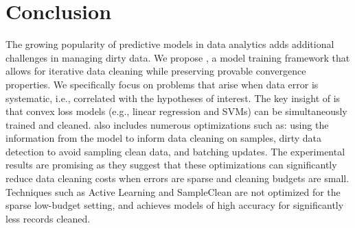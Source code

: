 \section{Conclusion}
The growing popularity of predictive models in data analytics adds additional challenges in managing dirty data.
We propose \sys, a model training framework that allows for iterative data cleaning while preserving provable convergence properties.
We specifically focus on problems that arise when data error is systematic, i.e., correlated with the hypotheses of interest.
The key insight of \sys is that convex loss models (e.g., linear regression and SVMs) can be simultaneously trained and cleaned.
\sys also includes numerous optimizations such as: using the information from the model to inform data cleaning on samples, dirty data detection to avoid sampling clean data, and batching updates.
The experimental results are promising as they suggest that these optimizations can significantly reduce data cleaning costs when errors are sparse and cleaning budgets are small.
Techniques such as Active Learning and SampleClean are not optimized for the sparse low-budget setting, and \sys achieves models of high accuracy for significantly less records cleaned.